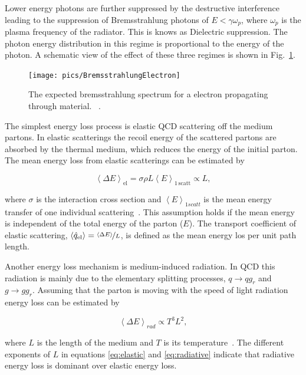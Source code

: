 Lower energy photons are further suppressed by the destructive interference leading to the suppression of Bremsstrahlung photons of $E < \gamma \omega_p$, where $\omega_p$ is the plasma frequency of the radiator. This is knows as Dielectric suppression. The photon energy distribution in this regime is proportional to the energy of the photon. A schematic view of the effect of these three regimes is shown in Fig.~\ref{fig:bremsstrahlung}.

\begin{figure}
\centering
\texttt{[image: pics/BremsstrahlungElectron]}
\caption[Photon spectrum]{ The expected bremsstrahlung spectrum for a electron propagating through material.  ~\cite{Bosted1993QuantummechanicalSO}. }
\label{fig:bremsstrahlung}
\end{figure}

The simplest energy loss process is elastic QCD scattering off the medium partons. In elastic scatterings the recoil energy of the scattered partons are absorbed by the thermal medium, which reduces the energy of the initial parton. The mean energy loss from elastic scatterings can be estimated by

\begin{equation}
\left<\Delta E\right>_{\mathrm{el}}=\sigma \rho L \left<E\right>_{\mathrm{1\,scatt}}\propto L,
\label{eq:elastic}
\end{equation}

\noindent where $\sigma$ is the interaction cross section and $\left<E\right>_{1 scatt}$ is the mean energy transfer of one individual scattering~\cite{Majumder:2010qh}. This assumption holds if the mean energy is independent of the total energy of the parton ($E$). The transport coefficient of elastic scattering, $\left< \hat q_\mathrm{el}\right> = \nicefrac{\left< \Delta E\right>}{L}$, is defined as the mean energy los per unit path length.

Another energy loss mechanism is medium-induced radiation. In QCD this radiation is mainly due to the elementary splitting processes, $q\rightarrow qg_r$ and $g\rightarrow gg_r$. Assuming that the parton is moving with the speed of light radiation energy loss can be estimated by

\begin{equation}
\left<\Delta E\right>_{rad}\propto T^3L^2,
\label{eq:radiative}
\end{equation}

\noindent where $L$ is the length of the medium and $T$ is its temperature~\cite{Dominguez:2008vd}. The different exponents of $L$ in equations \ref{eq:elastic} and \ref{eq:radiative} indicate that radiative energy loss is dominant over elastic energy loss.


